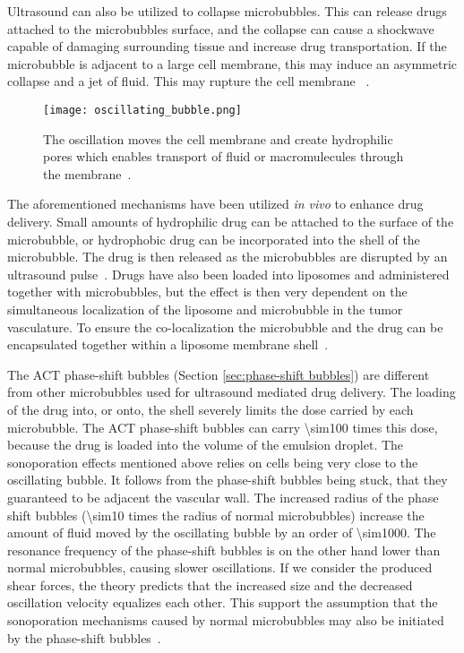 Ultrasound can also be utilized to collapse microbubbles. This can release drugs attached to the microbubbles surface, and the collapse can cause a shockwave capable of damaging surrounding tissue and increase drug transportation. If the microbubble is adjacent to a large cell membrane, this may induce an asymmetric collapse and a jet of fluid. This may rupture the cell membrane ~\cite{Pitt2004}.  

\begin{figure}[h]
  \centering
  \texttt{[image: oscillating\_bubble.png]}
  \caption{The oscillation moves the cell membrane and create hydrophilic pores which enables transport of fluid or macromulecules through the membrane~\cite{VanWamel2006a}.}
  \label{Fig:oscillating_bubble}
\end{figure}


The aforementioned mechanisms have been utilized \textit{in vivo} to enhance drug delivery. Small amounts of hydrophilic drug can be attached to the surface of the microbubble, or hydrophobic drug can be incorporated into the shell of the microbubble. The drug is then released as the microbubbles are disrupted by an ultrasound pulse~\cite{Liu2006}. Drugs have also been loaded into liposomes and administered together with microbubbles, but the effect is then very dependent on the simultaneous localization of the liposome and microbubble in the tumor vasculature. To ensure the co-localization the microbubble and the drug can be encapsulated together within a liposome membrane shell~\cite{Ibsen2011}.


The ACT\texttrademark{} phase-shift bubbles (Section \ref{sec:phase-shift bubbles}) are different from other microbubbles used for ultrasound mediated drug delivery. The loading of the drug into, or onto, the shell severely limits the dose carried by each microbubble. The ACT\texttrademark{} phase-shift bubbles can carry \num{\sim100} times this dose, because the drug is loaded into the volume of the emulsion droplet. The sonoporation effects mentioned above relies on cells being very close to the oscillating bubble. It follows from the phase-shift bubbles being stuck, that they guaranteed to be adjacent the vascular wall. The increased radius of the phase shift bubbles (\num{\sim10} times the radius of normal microbubbles) increase the amount of fluid moved by the oscillating bubble by an order of \num{\sim1000}. The resonance frequency of the phase-shift bubbles is on the other hand lower than normal microbubbles, causing slower oscillations. If we consider the produced shear forces, the theory predicts that the increased size and the decreased oscillation velocity equalizes each other. This support the assumption that the sonoporation mechanisms caused by normal microbubbles may also be initiated by the phase-shift bubbles~\cite{Healey_pc}.


